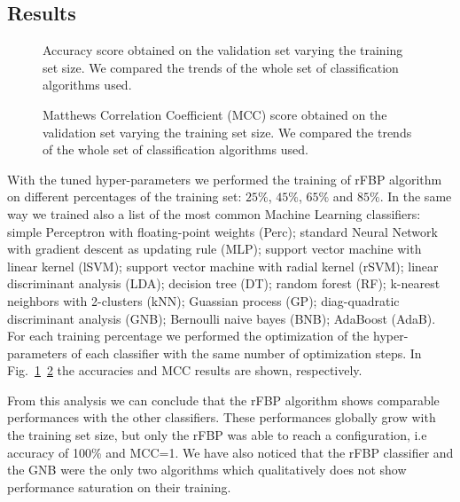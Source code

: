 \documentclass{standalone}
\begin{document}
\subsection[Results]{Results}\label{rfbp:snp_result}

\begin{figure}[htbp]
\centering
\def\svgwidth{\textwidth}

\caption{Accuracy score obtained on the validation set varying the training set size.
We compared the trends of the whole set of classification algorithms used.
}
\label{fig:confronto_bestclassificatoriACC}
\end{figure}


\begin{figure}[htbp]
\centering
\def\svgwidth{\textwidth}

\caption{Matthews Correlation Coefficient (MCC) score obtained on the validation set varying the training set size.
We compared the trends of the whole set of classification algorithms used.
}
\label{fig:confronto_bestclassificatoriMCC}
\end{figure}

With the tuned hyper-parameters we performed the training of rFBP algorithm on different percentages of the training set: $25\%$, $45\%$, $65\%$ and $85\%$.
In the same way we trained also a list of the most common Machine Learning classifiers: simple Perceptron with floating-point weights (Perc); standard Neural Network with gradient descent as updating rule (MLP); support vector machine with linear kernel (lSVM); support vector machine with radial kernel (rSVM); linear discriminant analysis (LDA); decision tree (DT); random forest (RF); k-nearest neighbors with 2-clusters (kNN); Guassian process (GP); diag-quadratic discriminant analysis (GNB); Bernoulli naive bayes (BNB); AdaBoost (AdaB).
For each training percentage we performed the optimization of the hyper-parameters of each classifier with the same number of optimization steps.
In Fig.~\ref{fig:confronto_bestclassificatoriACC}~\ref{fig:confronto_bestclassificatoriMCC} the accuracies and MCC results are shown, respectively.

From this analysis we can conclude that the rFBP algorithm shows comparable performances with the other classifiers.
These performances globally grow with the training set size, but only the rFBP was able to reach a  configuration, i.e accuracy of 100\% and MCC=1.
We have also noticed that the rFBP classifier and the GNB were the only two algorithms which qualitatively does not show performance saturation on their training.
\end{document}
